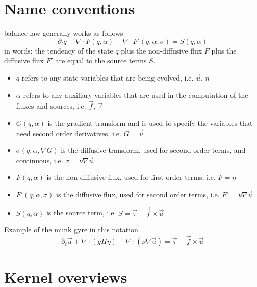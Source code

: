 \documentclass{article}
\begin{document}
\section{Name conventions}
balance law generally works as follows
\begin{equation}
    \partial_t q + \nabla \cdot F (q, \alpha) - \nabla \cdot F' (q, \alpha, \sigma) = S(q, \alpha)
\end{equation}
in words: the tendency of the state $q$ plus the non-diffusive flux $F$ plus the diffusive flux $F'$ are equal to the source terms $S$.
\begin{itemize}
\item $q$ refers to any state variables that are being evolved, i.e. $\vec u$, $\eta$
\item $\alpha$ refers to any auxiliary variables that are used in the computation of the fluxes and sources, i.e. $\vec f$, $\vec \tau$
\item $G(q, \alpha)$ is the gradient transform and is used to specify the variables that need second order derivatives, i.e. $G = \vec u$
\item $\sigma(q, \alpha, \nabla G)$ is the diffusive transform, used for second order terms, and continuous, i.e. $\sigma = \nu \nabla \vec u$
\item $F(q, \alpha)$ is the non-diffusive flux, used for first order terms, i.e. $F = \eta$
\item $F'(q, \alpha, \sigma)$ is the diffusive flux, used for second order terms, i.e. $F' = \nu \nabla \vec u$
\item $S(q, \alpha)$ is the source term, i.e. $S = \vec \tau - \vec f \times \vec u$
\end{itemize}

Example of the munk gyre in this notation
\begin{equation}
    \partial_t \vec u + \nabla \cdot \left( g H \eta \right) - \nabla \cdot \left( \nu \nabla \vec u \right) = \vec \tau - \vec f \times \vec u
\end{equation}

\section{Kernel overviews}
\end{document}
